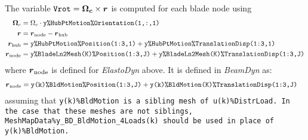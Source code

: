 \documentclass[11pt]{article}
\begin{document}
The variable $\texttt{Vrot}=\boldsymbol{\Omega_c}\times\boldsymbol{r}$ is computed for each blade node using
\begin{align}
    \boldsymbol{\Omega}_c  &= \Omega_c \cdot \texttt{y\%HubPtMotion\%Orientation(1,:,1)}\nonumber\\
    \boldsymbol{r} &= \boldsymbol{r}_\text{node} - \boldsymbol{r}_\text{hub} \label{eq:Vrot}  \\
    \boldsymbol{r}_\text{hub} &= \texttt{y\%HubPtMotion\%Position(1:3,1)} + \texttt{y\%HubPtMotion\%TranslationDisp(1:3,1)}  \nonumber \\
    \boldsymbol{r}_\text{node} &= \texttt{y\%BladeLn2Mesh(K)\%Position(1:3,J)} + \texttt{y\%BladeLn2Mesh(K)\%TranslationDisp(1:3,J)}  \nonumber 
\end{align}
where $\boldsymbol{r}_\text{node}$ is defined for \textit{ElastoDyn} above. It is defined in \textit{BeamDyn} as:
\begin{align}
    \boldsymbol{r}_\text{node} &= \texttt{y(k)\%BldMotion\%Position(1:3,J)} + \texttt{y(k)\%BldMotion(K)\%TranslationDisp(1:3,J)}  \nonumber 
\end{align}
assuming that \tt{y(k)\%BldMotion} is a sibling mesh of \tt{u(k)\%DistrLoad}. In the case that these meshes are not siblings, 
\tt{MeshMapData\%y\_BD\_BldMotion\_4Loads(k)} should be used in place of \tt{y(k)\%BldMotion}.


% 

%
%
\end{document}
